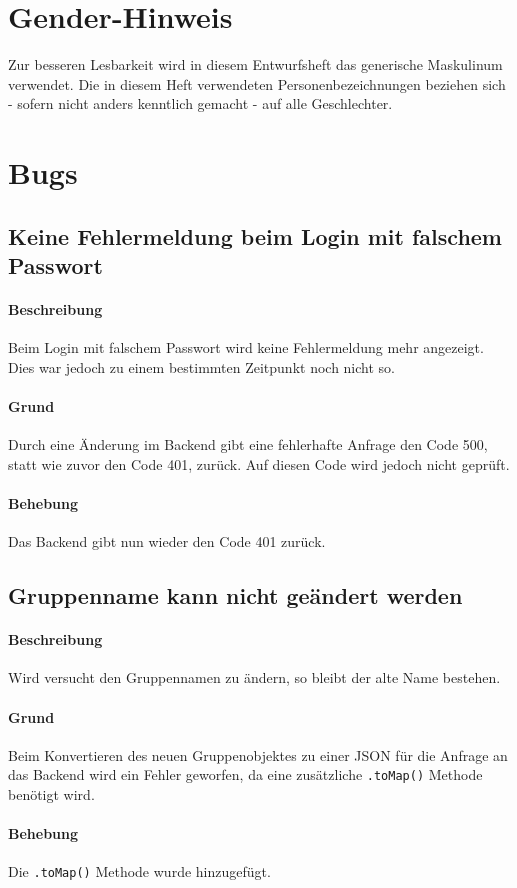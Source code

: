 \documentclass{qualitätssicherungsheft}
\begin{document}

\maketitle
\tableofcontents
\newpage

\section*{Gender-Hinweis}
Zur besseren Lesbarkeit wird in diesem Entwurfsheft das generische Maskulinum verwendet.
Die in diesem Heft verwendeten Personenbezeichnungen beziehen sich - sofern nicht anders kenntlich gemacht - auf alle Geschlechter.
\newpage
\section{Bugs}
\subsection{Keine Fehlermeldung beim Login mit falschem Passwort}
\paragraph*{Beschreibung} Beim Login mit falschem Passwort wird keine Fehlermeldung mehr angezeigt. Dies war jedoch zu einem bestimmten Zeitpunkt noch nicht so.
\paragraph{Grund} Durch eine Änderung im Backend 
gibt eine fehlerhafte Anfrage den Code 500, statt wie zuvor den Code 401, zurück. Auf diesen Code wird jedoch nicht geprüft.
\paragraph{Behebung} Das Backend gibt nun wieder den Code 401 zurück.
\newpage
\subsection{Gruppenname kann nicht geändert werden}
\paragraph*{Beschreibung} Wird versucht den Gruppennamen zu ändern, so bleibt der alte Name bestehen.
\paragraph{Grund} Beim Konvertieren des neuen Gruppenobjektes zu einer JSON für die Anfrage an das Backend wird ein Fehler geworfen, da eine zusätzliche \texttt{.toMap()} Methode benötigt wird.
\paragraph{Behebung} Die \texttt{.toMap()} Methode wurde hinzugefügt.
\end{document}
